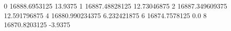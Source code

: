 0 16888.6953125 13.9375
1 16887.48828125 12.73046875
2 16887.349609375 12.591796875
4 16880.990234375 6.232421875
6 16874.7578125 0.0
8 16870.8203125 -3.9375
